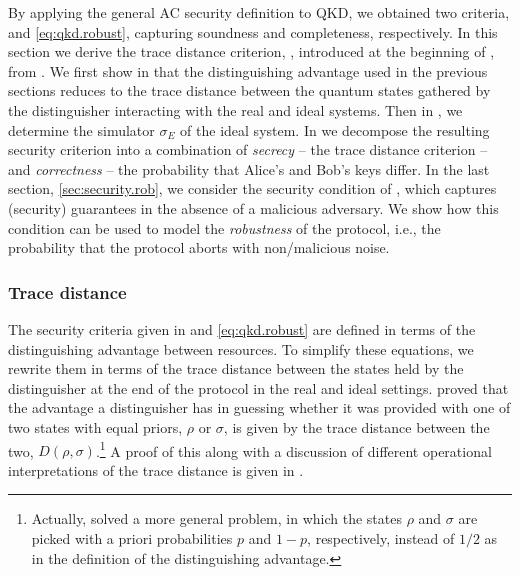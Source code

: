 By applying the general AC security definition to QKD, we obtained two
criteria,  and \eqref{eq:qkd.robust},
capturing soundness and completeness, respectively. In this section we
derive the trace distance criterion, , introduced at the
beginning of , from . We first
show in  that the distinguishing advantage
used in the previous sections reduces to the trace distance between
the quantum states gathered by the distinguisher interacting with the
real and ideal systems. Then in , we
determine the simulator $\sigma_E$ of the ideal system. In
 we decompose the resulting security
criterion into a combination of \emph{secrecy} \--- the trace distance
criterion \--- and \emph{correctness} \--- the probability that
Alice's and Bob's keys differ. In the last section,
\ref{sec:security.rob}, we consider the security condition of
, which captures (security) guarantees in the
absence of a malicious adversary.  We show how this condition can be
used to model the \emph{robustness} of the protocol, i.e., the
probability that the protocol aborts with non\-/malicious noise.

\subsubsection{Trace distance}
\label{sec:security.dist}

The security criteria given in  and
\eqref{eq:qkd.robust} are defined in terms of the distinguishing
advantage between resources. To simplify these equations, we rewrite
them in terms of the trace distance between the states held by the
distinguisher at the end of the protocol in the real and ideal
settings. \textcite{Hel76} proved that the advantage a distinguisher
has in guessing whether it was provided with one of two states with
equal priors, $\rho$ or $\sigma$, is given by the trace distance
between the two, $D(\rho,\sigma)$.\footnote{Actually, \textcite{Hel76}
  solved a more general problem, in which the states $\rho$ and
  $\sigma$ are picked with a priori probabilities $p$ and $1-p$,
  respectively, instead of $1/2$ as in the definition of the
  distinguishing advantage.} A proof of this along with a discussion
of different operational interpretations of the trace distance is
given in .

